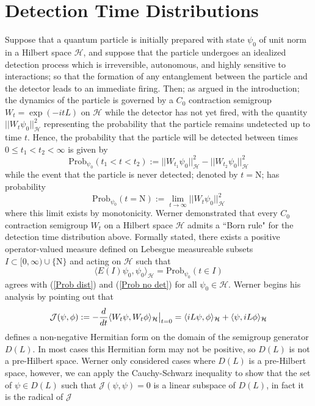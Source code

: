 \documentclass{article}
\numberwithin{equation}{section}
\begin{document}
\section{Detection Time Distributions}
Suppose that a quantum particle is initially prepared with state $\psi_0$ of unit norm in a Hilbert space $\mathcal{H}$, and suppose that the particle undergoes an idealized detection process which is irreversible, autonomous, and highly sensitive to interactions; so that the formation of any entanglement between the particle and the detector leads to an immediate firing. Then; as argued in the introduction; the dynamics of the particle is governed by a $C_0$ contraction semigroup $W_t=\exp(-itL)$ on $\mathcal{H}$ while the detector has not yet fired, with the quantity $||W_t\psi_0||_{\mathcal{H}}^2$ representing the probability that the particle remains undetected up to time $t$. Hence, the probability that the particle will be detected between times $0\leq t_1<t_2<\infty$ is given by
\begin{equation}\label{Prob dist}
    \text{Prob}_{\psi_0}(t_1<t<t_2):=||W_{t_1}\psi_0||_{\mathcal{H}}^2 - ||W_{t_2}\psi_0||_{\mathcal{H}}^2
\end{equation}
while the event that the particle is never detected; denoted by $t=\text{N}$; has probability
\begin{equation}\label{Prob no det}
    \text{Prob}_{\psi_0}(t=\text{N}):=\lim_{t \to \infty}||W_t\psi_0||_{\mathcal{H}}^2
\end{equation}
where this limit exists by monotonicity. Werner \cite{Werner1987}  demonstrated that every $C_0$ contraction semigroup $W_t$ on a Hilbert space $\mathcal{H}$ admits a ``Born rule" for the detection time distribution above. Formally stated, there exists a positive operator-valued measure defined on Lebesgue measureable subsets $I \subset [0,\infty)\cup \{\text{N}\}$ and acting on $\mathcal{H}$ such that
\begin{equation}
    \langle E(I)\psi_0,\psi_0\rangle_{\mathcal{H}}=\text{Prob}_{\psi_0}(t \in I)
\end{equation}
agrees with (\ref{Prob dist}) and (\ref{Prob no det}) for all $\psi_0 \in \mathcal{H}$. Werner begins his analysis by pointing out that
\begin{equation}
    \mathcal{J}(\psi,\phi):=-\frac{d}{dt}\langle W_t\psi, W_t\phi\rangle_{\mathcal{H}}\big{|}_{t=0}=\langle iL \psi,\phi\rangle_{\mathcal{H}}+\langle \psi,iL\phi\rangle_{\mathcal{H}}
\end{equation}
defines a non-negative Hermitian form on the domain of the semigroup generator $D(L)$. In most cases this Hermitian form may not be positive, so $D(L)$ is not a pre-Hilbert space. Werner only considered cases where $D(L)$ is a pre-Hilbert space, however, we can apply the Cauchy-Schwarz inequality to show that the set of $\psi\in D(L)$ such that $\mathcal{J}(\psi,\psi)=0$ is a linear subspace of $D(L)$, in fact it is the radical of $\mathcal{J}$
\end{document}

